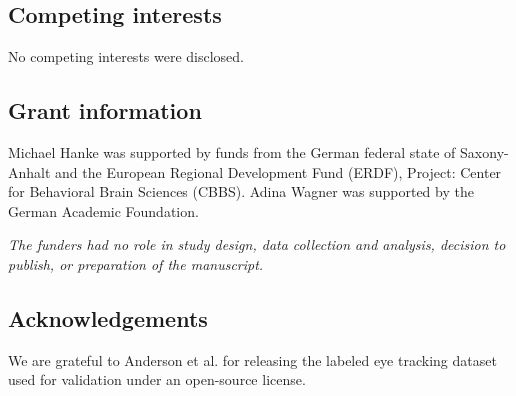 \documentclass[10pt,a4paper]{extarticle}
\begin{document}
\subsection*{Competing interests}
No competing interests were disclosed.

\subsection*{Grant information}
Michael Hanke was supported by funds from the German federal state of
Saxony-Anhalt and the European Regional Development Fund (ERDF), 
Project: Center for Behavioral Brain Sciences (CBBS).
Adina Wagner was supported by the German Academic Foundation.

\textit{The funders had no role in study design, data collection and analysis,
decision to publish, or preparation of the manuscript.}

\subsection*{Acknowledgements}
We are grateful to Anderson et al. \cite{Andersson2017} for releasing the labeled
eye tracking dataset used for validation under an open-source license.

{\small
}

\end{document}
